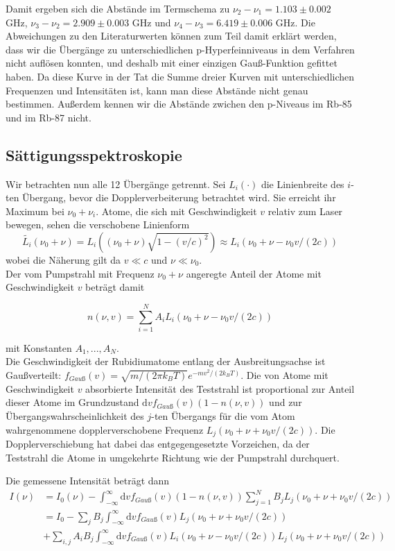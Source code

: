 \documentclass[a4paper,parskip]{scrartcl}
\begin{document}
Damit ergeben sich die Abstände im Termschema zu $\nu_2 - \nu_1 = 1.103 \pm 0.002$ GHz,  $\nu_3 - \nu_2 = 2.909 \pm 0.003$ GHz und $\nu_4 - \nu_3 = 6.419 \pm 0.006$ GHz. Die Abweichungen zu den Literaturwerten können zum Teil damit erklärt werden, dass wir die Übergänge zu unterschiedlichen p-Hyperfeinniveaus in dem Verfahren nicht auflösen konnten, und deshalb mit einer einzigen Gauß-Funktion gefittet haben. Da diese Kurve in der Tat die Summe dreier Kurven mit unterschiedlichen Frequenzen und Intensitäten ist, kann man diese Abstände nicht genau bestimmen. Außerdem kennen wir die Abstände zwichen den p-Niveaus im Rb-85 und im Rb-87 nicht.

\subsection{Sättigungsspektroskopie}

Wir betrachten nun alle 12 Übergänge getrennt. Sei $L_i(\cdot )$ die Linienbreite des $i$-ten Übergang, bevor die Dopplerverbeiterung betrachtet wird. Sie erreicht ihr Maximum bei $\nu_0+\nu_i$. Atome, die sich mit Geschwindigkeit $v$ relativ zum Laser bewegen, sehen die verschobene Linienform
$$\tilde{L_i}(\nu_0+\nu) = L_i((\nu_0+\nu)\sqrt{1-(v/c)^2}) \approx L_i(\nu_0+\nu-\nu_0 v/(2c))$$
wobei die Näherung gilt da $v \ll c$ und $\nu \ll \nu_0$.\\
  Der vom Pumpstrahl mit Frequenz $\nu_0+\nu$ angeregte Anteil der Atome mit Geschwindigkeit $v$ beträgt damit

$$n(\nu, v) = \sum_{i=1}^N A_i L_i(\nu_0+\nu-\nu_0 v/(2c))$$

mit Konstanten $A_1, ..., A_N$.\\

Die Geschwindigkeit der Rubidiumatome entlang der Ausbreitungsachse ist Gaußverteilt: $f_{Gauß}(v) = \sqrt{m/(2\pi k_B T)} e^{-mv^2/(2k_BT)}$. Die von Atome mit Geschwindigkeit $v$ absorbierte Intensität des Teststrahl ist proportional zur Anteil dieser Atome im Grundzustand $\mathrm{d}v f_{Gauß}(v)(1-n(\nu, v))$ und zur Übergangswahrscheinlichkeit des $j$-ten Übergangs für die vom Atom wahrgenommene dopplerverschobene Frequenz $L_j(\nu_0+\nu+\nu_0 v/(2c))$. Die Dopplerverschiebung hat dabei das entgegengesetzte Vorzeichen, da der Teststrahl die Atome in umgekehrte Richtung wie der Pumpstrahl durchquert.

 Die gemessene Intensität beträgt dann
\begin{align*}
I(\nu) &= I_0(\nu)-\int_{-\infty}^{\infty} \mathrm{d}v f_{Gauß}(v)(1-n(\nu, v))\sum_{j=1}^N B_j L_j(\nu_0+\nu+\nu_0 v/(2c)) \\
&= I_0 -\sum_j B_j \int_{-\infty}^{\infty} \mathrm{d}v f_{Gauß}(v) L_j(\nu_0+\nu+\nu_0 v/(2c)) \\
&+\sum_{i,j} A_iB_j \int_{-\infty}^{\infty} \mathrm{d}v f_{Gauß}(v) L_i(\nu_0+\nu-\nu_0 v/(2c)) L_j(\nu_0+\nu+\nu_0 v/(2c))
\end{align*}
\end{document}
